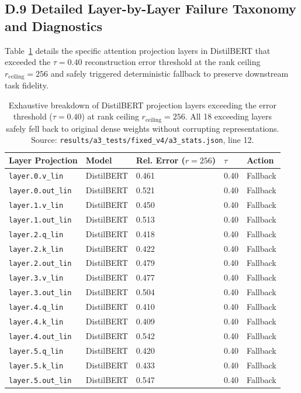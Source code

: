 \subsection{D.9 Detailed Layer-by-Layer Failure Taxonomy and Diagnostics}
\label{sec:app\_failure\_taxonomy}

Table~\ref{tab:app\_failure\_cases} details the specific attention projection layers in DistilBERT that exceeded the $\tau=0.40$ reconstruction error threshold at the rank ceiling $r_{\mathrm{ceiling}}=256$ and safely triggered deterministic fallback to preserve downstream task fidelity.

\begin{table}[H]
\centering
\scriptsize
\setlength{\tabcolsep}{3pt}
\begin{tabular}{p{}p{}p{}p{}p{}}
\toprule
\textbf{Layer Projection} & \textbf{Model} & \textbf{Rel. Error ($r=256$)} & \textbf{$\tau$} & \textbf{Action} \\
\midrule
\texttt{layer.0.v\_lin} & DistilBERT & 0.461 & 0.40 & Fallback \\
\texttt{layer.0.out\_lin} & DistilBERT & 0.521 & 0.40 & Fallback \\
\texttt{layer.1.v\_lin} & DistilBERT & 0.450 & 0.40 & Fallback \\
\texttt{layer.1.out\_lin} & DistilBERT & 0.513 & 0.40 & Fallback \\
\texttt{layer.2.q\_lin} & DistilBERT & 0.418 & 0.40 & Fallback \\
\texttt{layer.2.k\_lin} & DistilBERT & 0.422 & 0.40 & Fallback \\
\texttt{layer.2.out\_lin} & DistilBERT & 0.479 & 0.40 & Fallback \\
\texttt{layer.3.v\_lin} & DistilBERT & 0.477 & 0.40 & Fallback \\
\texttt{layer.3.out\_lin} & DistilBERT & 0.504 & 0.40 & Fallback \\
\texttt{layer.4.q\_lin} & DistilBERT & 0.410 & 0.40 & Fallback \\
\texttt{layer.4.k\_lin} & DistilBERT & 0.409 & 0.40 & Fallback \\
\texttt{layer.4.out\_lin} & DistilBERT & 0.542 & 0.40 & Fallback \\
\texttt{layer.5.q\_lin} & DistilBERT & 0.420 & 0.40 & Fallback \\
\texttt{layer.5.k\_lin} & DistilBERT & 0.433 & 0.40 & Fallback \\
\texttt{layer.5.out\_lin} & DistilBERT & 0.547 & 0.40 & Fallback \\
\bottomrule
\end{tabular}
\caption{Exhaustive breakdown of DistilBERT projection layers exceeding the error threshold ($\tau = 0.40$) at rank ceiling $r_{\mathrm{ceiling}}=256$. All 18 exceeding layers safely fell back to original dense weights without corrupting representations. Source: \texttt{results/a3\_tests/fixed\_v4/a3\_stats.json}, line 12.}
\label{tab:app\_failure\_cases}
\end{table}